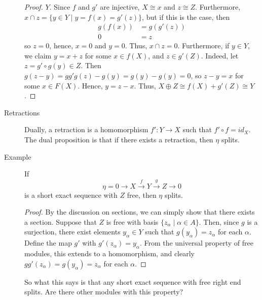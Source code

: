 \documentclass[12pt]{article}
\begin{document}
\begin{description}
\begin{proof}
    $Y$. Since $f$ and $g'$ are injective, $X\cong x$ and $z\cong
    Z$. Furthermore, $x\cap z = \{y\in Y \mid y=f(x)=g'(z)\}$, but if
    this is the case, then
    \begin{align*}
      g(f(x)) &= g(g'(z))\\
      0 &= z
    \end{align*}
so $z=0$, hence, $x=0$ and $y=0$. Thus, $x\cap z=0$. Furthermore, if
$y\in Y$, we claim $y=x+z$ for some $x\in f(X)$, and $z\in
g'(Z)$. Indeed, let  $z=g'\circ g(y)\in Z$. Then $g(z-y) =
gg'g(z)-g(y) = g(y)-g(y)=0$, so $z-y=x$ for some $x\in F(X)$. Hence,
$y=z-x$. Thus, $X\oplus Z \cong f(X)+g'(Z)\cong Y$. 
  \end{proof}
\item[Retractions] Dually, a retraction is a homomorphism
  $f':Y\rightarrow X$ such that $f'\circ f=id_X$. The dual proposition
  is that if there exists a retraction, then $\eta$ splits. 
\item[Example] If \[\eta=0 \rightarrow X \xrightarrow{f} Y \xrightarrow{g} Z \rightarrow
    0 \] is a short exact sequence with $Z$ free, then $\eta$ splits.
  \begin{proof}
    By the discussion on sections, we can simply show that there
    exists a section. Suppose that $Z$ is free with basis $\{z_\alpha
    \mid \alpha \in A\}$. Then, since $g$ is a surjection, there exist
    elements $y_\alpha \in Y$ such that $g(y_\alpha)=z_\alpha$ for
    each $\alpha$. Define the map $g'$ with
    $g'(z_\alpha)=y_\alpha$. From the universal property of free
    modules, this extends to a homomorphism, and clearly
    $gg'(z_\alpha)=g(y_\alpha)=z_\alpha$ for each $\alpha$. 
  \end{proof}
So what this says is that any short exact sequence with free right end
splits. Are there other modules with this property? 



\end{description}
\end{document}
